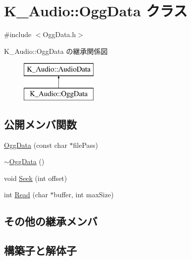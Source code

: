 \hypertarget{class_k___audio_1_1_ogg_data}{}\section{K\+\_\+\+Audio\+:\+:Ogg\+Data クラス}
\label{class_k___audio_1_1_ogg_data}


{\ttfamily \#include $<$Ogg\+Data.\+h$>$}

K\+\_\+\+Audio\+:\+:Ogg\+Data の継承関係図\begin{figure}[H]
\begin{center}
\leavevmode
\includegraphics[height=2.000000cm]{class_k___audio_1_1_ogg_data}
\end{center}
\end{figure}
\subsection*{公開メンバ関数}
\begin{DoxyCompactItemize}
\item 
\mbox{\hyperlink{class_k___audio_1_1_ogg_data_a846e59bd024858fee33549b66f2697eb}{Ogg\+Data}} (const char $\ast$file\+Pass)
\item 
\mbox{\hyperlink{class_k___audio_1_1_ogg_data_a60aee716522004f16e11203677d3f63b}{$\sim$\+Ogg\+Data}} ()
\item 
void \mbox{\hyperlink{class_k___audio_1_1_ogg_data_aac0e955981398bf31053f27fbe19b2ba}{Seek}} (int offset)
\item 
int \mbox{\hyperlink{class_k___audio_1_1_ogg_data_ac4c50916e0f2eaa384539b2dbedc1d6e}{Read}} (char $\ast$buffer, int max\+Size)
\end{DoxyCompactItemize}
\subsection*{その他の継承メンバ}


\subsection{構築子と解体子}
\mbox{\label{class_k___audio_1_1_ogg_data_a846e59bd024858fee33549b66f2697eb}} 
